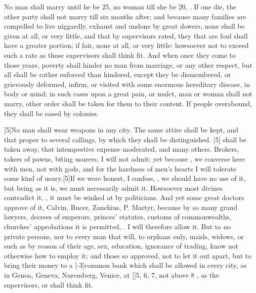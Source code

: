{No man shall marry until he be 25, no woman till she be 20, 
. If one die, the other party shall
not marry till six months after; and because many families are
compelled to live niggardly, exhaust and undone by great dowers,
none shall be given at all, or very little, and that by
supervisors rated, they that are foul shall have a greater portion; if
fair, none at all, or very little: howsoever not to exceed such a
rate as those supervisors shall think fit. And when once they come to
those years, poverty shall hinder no man from marriage, or any other
respect, but all shall be rather enforced than hindered,
except they be dismembered, or grievously deformed, infirm,
or visited with some enormous hereditary disease, in body or mind; in
such cases upon a great pain, or mulct, man or woman shall not
marry, other order shall be taken for them to their content. If people
overabound, they shall be eased by colonies.

[5\baselineskip]No man shall wear weapons in any city. The same attire shall be
kept, and that proper to several callings, by which they shall be
distinguished. [5\baselineskip] shall be taken away, that
intempestive expense moderated, and many others. Brokers, takers of
pawns, biting usurers, I will not admit; yet because , we converse here with men, not with gods, and for
the hardness of men's hearts I will tolerate some kind of usury.[5\baselineskip]If
we were honest, I confess, , we should have no use of
it, but being as it is, we must necessarily admit it. Howsoever most
divines contradict it, ,
it must be winked at by politicians. And yet some great doctors approve
of it, Calvin, Bucer, Zanchius, P. Martyr, because by so many grand
lawyers, decrees of emperors, princes' statutes, customs of
commonwealths, churches' approbations it is permitted, \etc{}. I will
therefore allow it. But to no private persons, nor to every man that
will, to orphans only, maids, widows, or such as by reason of their
age, sex, education, ignorance of trading, know not otherwise how to
employ it; and those so approved, not to let it out apart, but to bring
their money to a [-3\baselineskip]common bank which shall be allowed in every city,
as in Genoa, Geneva, Nuremberg, Venice, at [\baselineskip]5, 6, 7, not above 8
, as the supervisors, or  shall think fit.

}
